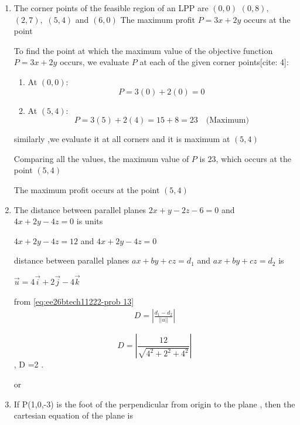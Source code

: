 \begin{enumerate}[label=\thesubsection.\arabic*, ref=\thesubsection.\theenumi]
\solution

$2x^2 - 18 =0$ , $x=\pm 3$

\begin{align}
	\textbf{codes/12/q12.py}
\end{align}
\item 

The corner points of the feasible region of an LPP are $(0,0)$ $(0,8),$ $(2,7),$ $(5,4)$ and $(6,0)$ The maximum profit $P=3x+2y$ occurs at the point 

\solution

To find the point at which the maximum value of the objective function $P = 3x + 2y$ occurs, we evaluate $P$ at each of the given corner points[cite: 4]:

\begin{enumerate}
    \item At $(0,0)$:
    $$P = 3(0) + 2(0) = 0$$

   

    \item At $(5,4)$:
    $$P = 3(5) + 2(4) = 15 + 8 = 23 \quad \text{(Maximum)}$$

    
\end{enumerate}

similarly ,we evaluate it at all corners and it is maximum at $(5,4)$ 

Comparing all the values, the maximum value of $P$ is $23$, which occurs at the point $(5,4)$



The maximum profit occurs at the point $(5,4)$

\item 

The distance between parallel planes $2x+y-2z-6=0$ and $4x+2y-4z=0$ is units

\solution

$4x+2y-4z= 12$ and $4x+2y-4z=0$ 

distance between parallel planes $ax +by +cz= d_1 $ and $ax+by +cz=d_2$ is

$\vec{u}=4\vec{i}+2\vec{j}-4\vec{k}$

from \eqref{eq:ee26btech11222-prob 13}
\begin{align}
 D=\left|\frac{d_1-d_2}{\vert|u|\vert{}}\right|
 \end{align}

$$D=\left\vert{}\frac{12}{\sqrt{4^2 + 2^2+ 4^2}}\right \vert{}$$ , D =2 .

\begin{center}
	or 
\end{center}
\item 
If P(1,0,-3) is the foot of the perpendicular from origin to the plane , then the cartesian equation of the plane is 


\end{enumerate}
